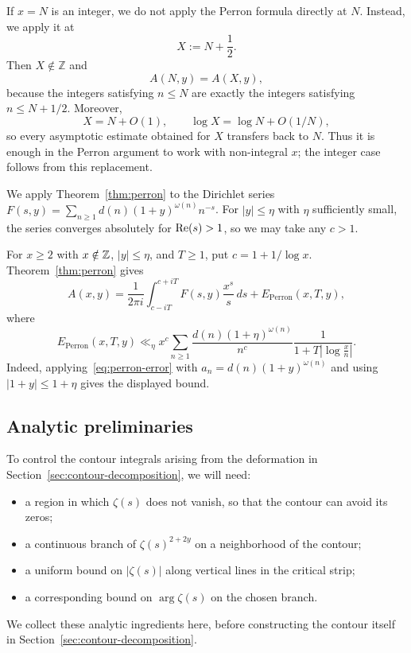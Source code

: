 If $x=N$ is an integer, we do not apply the Perron formula directly
at $N$. Instead, we apply it at
\[
    X := N+\frac12.
\]
Then $X\notin\mathbb Z$ and
\[
    A(N,y)=A(X,y),
\]
because the integers satisfying $n\leq N$ are exactly the integers
satisfying $n\leq N+1/2$. Moreover,
\[
    X=N+O(1),\qquad \log X=\log N+O(1/N),
\]
so every asymptotic estimate obtained for $X$ transfers back to
$N$. Thus it is enough in the Perron argument to work with
non-integral $x$; the integer case follows from this replacement.

We apply Theorem~\ref{thm:perron} to the Dirichlet series
$F(s, y) = \sum_{n \geq 1} d(n) (1+y)^{\omega(n)} n^{-s}$. For
$|y| \leq \eta$ with $\eta$ sufficiently small, the series
converges absolutely for $\operatorname{Re}(s) > 1$, so we may take any $c > 1$.

For $x \geq 2$ with $x \notin \mathbb{Z}$, $|y| \leq \eta$, and $T \geq 1$,
put $c = 1+1/\log x$. Theorem~\ref{thm:perron} gives
\begin{equation}\label{eq:Axy-perron-representation}
    A(x, y) = \frac{1}{2\pi i} \int_{c - iT}^{c + iT}
    F(s, y) \frac{x^s}{s}\, ds
    + E_{\mathrm{Perron}}(x, T, y),
\end{equation}
where
\begin{equation}\label{eq:Eperron-weighted-raw}
    E_{\mathrm{Perron}}(x, T, y)
    \ll_{\eta}
    x^c
    \sum_{n\geq1}
    \frac{d(n)(1+\eta)^{\omega(n)}}{n^c}
    \frac{1}{1+T\left|\log\frac{x}{n}\right|}.
\end{equation}
Indeed, applying~\eqref{eq:perron-error} with
$a_n=d(n)(1+y)^{\omega(n)}$ and using $|1+y|\leq1+\eta$ gives
the displayed bound.

\subsection{Analytic preliminaries}\label{sec:analytic-prelim}

To control the contour integrals arising from the deformation in
Section~\ref{sec:contour-decomposition}, we will need:
\begin{itemize}
    \item[(a)] a region in which $\zeta(s)$ does not vanish, so
    that the contour can avoid its zeros;
    \item[(b)] a continuous branch of $\zeta(s)^{2 + 2y}$ on a
    neighborhood of the contour;
    \item[(c)] a uniform bound on $|\zeta(s)|$ along vertical
    lines in the critical strip;
    \item[(d)] a corresponding bound on $\arg\zeta(s)$ on the
    chosen branch.
\end{itemize}
We collect these analytic ingredients here, before constructing
the contour itself in Section~\ref{sec:contour-decomposition}.

